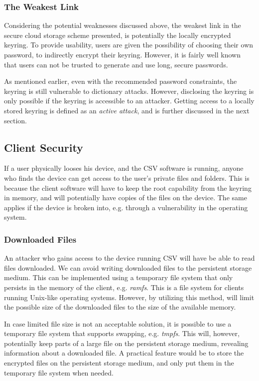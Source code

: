 \documentclass[pdftex,english,10pt,b5paper,twoside]{book}
\begin{document}
\subsubsection{The Weakest Link}

Considering the potential weaknesses discussed above, the weakest link in the
secure cloud storage scheme presented, is potentially the locally encrypted
keyring. To provide usability, users are given the possibility of choosing
their own password, to indirectly encrypt their keyring. However, it is fairly
well known that users can not be trusted to generate and use long, secure
passwords.

As mentioned earlier, even with the recommended password constraints, the
keyring is still vulnerable to dictionary attacks. However, disclosing the
keyring is only possible if the keyring is accessible to an attacker. Getting
access to a locally stored keyring is defined as an \emph{active attack}, and is
further discussed in the next section.

\subsection{Client Security}

If a user physically looses his device, and the \ac{CSV} software is running,
anyone who finds the device can get access to the user's private files and
folders. This is because the client software will have to keep the root
capability from the keyring in memory, and will potentially have copies of the
files on the device. The same applies if the device is broken into, e.g.
through a vulnerability in the operating system.

\subsubsection{Downloaded Files}

An attacker who gains access to the device running \ac{CSV} will have be able
to read files downloaded. We can avoid writing downloaded files to the
persistent storage medium. This can be implemented using a temporary file
system that only persists in the memory of the client, e.g. \emph{ramfs}. This
is a file system for clients running Unix-like operating systems.  However, by
utilizing this method, will limit the possible size of the downloaded files to
the size of the available memory.

In case limited file size is not an acceptable solution, it is possible to use
a temporary file system that supports swapping, e.g. \emph{tmpfs}.  This will,
however, potentially keep parts of a large file on the persistent storage
medium, revealing information about a downloaded file. A practical feature
would be to store the encrypted files on the persistent storage medium, and
only put them in the temporary file system when needed.
\end{document}
